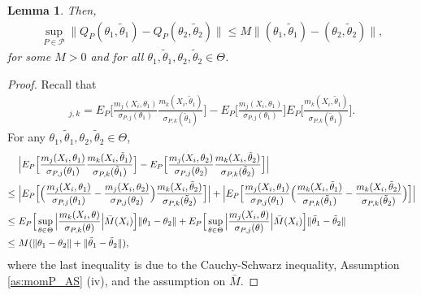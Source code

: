 \documentclass[letterpaper,11pt]{article}
\theoremstyle{myplain}
\newtheorem{lemma}{Lemma}[section]
\theoremstyle{mydefinition}
\theoremstyle{myremark}
\numberwithin{equation}{section}
\numberwithin{figure}{section}
\begin{document}
\begin{appendices}
\begin{lemma}
Then, 	
\begin{align}
\sup_{P\in\mathcal P}\|Q_P(\theta_1,\tilde\theta_1)-Q_P(\theta_2,\tilde\theta_2)\|\le M\|(\theta_1,\tilde\theta_1)-(\theta_2,\tilde\theta_2)\|,	\label{eq:correl_Lip0}
\end{align}
 for some $M>0$ and for all $\theta_1,\tilde\theta_1,\theta_2,\tilde\theta_2\in \Theta$.
\end{lemma}

\begin{proof}
Recall that 
\begin{align}
	[Q_P(\theta_1,\tilde\theta_1)]_{j,k}=E_P\Big[\frac{m_j(X_i,\theta_1)}{\sigma_{P,j}(\theta_1)}\frac{m_k(X_i,\tilde \theta_1)}{\sigma_{P,k}(\tilde \theta_1)}\Big]-E_P\Big[\frac{m_j(X_i,\theta_1)}{\sigma_{P,j}(\theta_1)}\Big]E_P\Big[\frac{m_k(X_i,\tilde\theta_1)}{\sigma_{P,k}(\tilde \theta_1)}\Big].\label{eq:correl_Lip1}
\end{align}	
For any $\theta_1,\tilde\theta_1,\theta_2,\tilde\theta_2\in \Theta$,
\begin{align}
&~\Big|E_P\Big[\frac{m_j(X_i,\theta_1)}{\sigma_{P,j}(\theta_1)}\frac{m_k(X_i,\tilde \theta_1)}{\sigma_{P,k}(\tilde \theta_1)}\Big]-E_P\Big[\frac{m_j(X_i,\theta_2)}{\sigma_{P,j}(\theta_2)}\frac{m_k(X_i,\tilde \theta_2)}{\sigma_{P,k}(\tilde \theta_2)}\Big]\Big|\notag\\
\le&~ 	\Big|E_P\Big[\Big(\frac{m_j(X_i,\theta_1)}{\sigma_{P,j}(\theta_1)}-\frac{m_j(X_i,\theta_2)}{\sigma_{P,j}(\theta_2)}\Big)\frac{m_k(X_i,\tilde \theta_2)}{\sigma_{P,k}(\tilde \theta_2)}\Big]\Big|+\Big|E_P\Big[\frac{m_j(X_i,\theta_1)}{\sigma_{P,j}(\theta_1)}\Big(\frac{m_k(X_i,\tilde \theta_1)}{\sigma_{P,k}(\tilde \theta_1)}-\frac{m_k(X_i,\tilde \theta_2)}{\sigma_{P,k}(\tilde \theta_2)}\Big)\Big]\Big|\notag\\
\le&~ E_P\Big[\sup_{\theta\in\Theta}\Big|\frac{m_k(X_i, \theta)}{\sigma_{P,k}( \theta)}\Big|\bar M(X_i)\Big]\|\theta_1-\theta_2\|+E_P\Big[\sup_{\theta\in\Theta}\Big|\frac{m_j(X_i, \theta)}{\sigma_{P,j}( \theta)}\Big|\bar M(X_i)\Big]\|\tilde\theta_1-\tilde\theta_2\|\notag\\
\le&~ M(\|\theta_1-\theta_2\|+\|\tilde\theta_1-\tilde\theta_2\|),\label{eq:correl_Lip2}
\end{align}
where the last inequality is due to the Cauchy-Schwarz inequality, Assumption \ref{as:momP_AS} (iv), and the assumption on $\bar M$.


\end{proof}
\end{appendices}
\end{document}

